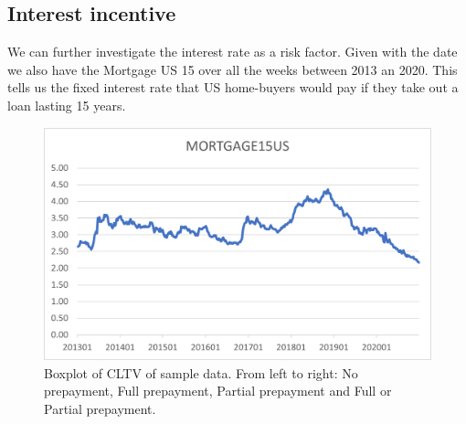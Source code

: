     
    

\subsection{Interest incentive}
We can further investigate the interest rate as a risk factor. Given with the date we also have the Mortgage US 15 over all the weeks between 2013 an 2020. This tells us the fixed interest rate that US home-buyers would pay if they take out a loan lasting 15 years.

    \begin{figure}[H]
        \centering
        \includegraphics[width=\linewidth]{Latex/Report/Figures/mortgage15US.png}
        \caption{Boxplot of CLTV of sample data. From left to right: No prepayment, Full prepayment, Partial prepayment and Full or Partial prepayment.}
        \label{mortgage15us}
    \end{figure}



